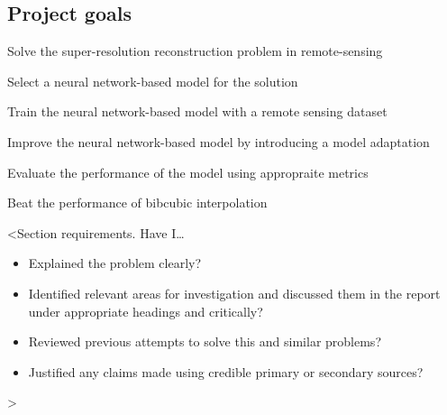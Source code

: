 \subsection{Project goals}
Solve the super-resolution reconstruction problem in remote-sensing

Select a neural network-based model for the solution

Train the neural network-based model with a remote sensing dataset

Improve the neural network-based model by introducing a model adaptation

Evaluate the performance of the model using appropraite metrics

Beat the performance of bibcubic interpolation

<Section requirements. Have I\dots
\begin{itemize}
    \item Explained the problem clearly?
    \item Identified relevant areas for investigation and discussed them in the report under appropriate headings and critically?
    \item Reviewed previous attempts to solve this and similar problems?
    \item Justified any claims made using credible primary or secondary sources?
\end{itemize}
>